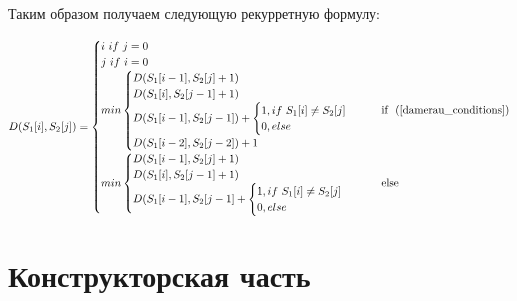 \documentclass[12pt, a4paper]{report}
\begin{document}
	Таким образом получаем следующую рекурретную формулу:
	
	\begin{equation}
	\label{formula_damerau}
	D(S_{1}[i],S_{2}[j]) = \begin{cases}
	i\ if\ j = 0\\
	j\ if\ i = 0\\
	min \begin{cases}
		D(S_{1}[i-1], S_{2}[j] + 1)\\
		D(S_{1}[i], S_{2}[j-1]+1)\\
		D(S_{1}[i-1], S_{2}[j-1])+
			\begin{cases}
				1, if\  S_{1}[i] \neq S_{2}[j]\\
				0, else
			\end{cases}\\
		D(S_{1}[i-2], S_{2}[j-2])+1
	\end{cases} & \mbox{if ~(\ref{damerau_conditions})}\\	
	min \begin{cases}
		D(S_{1}[i-1], S_{2}[j] + 1)\\
		D(S_{1}[i], S_{2}[j-1]+1)\\
		D(S_{1}[i-1], S_{2}[j-1]+
			\begin{cases}
				1, if\  S_{1}[i] \neq S_{2}[j]\\
				0, else
			\end{cases}
	\end{cases} & \mbox{else}\\
	\end{cases}
	\end{equation}

	\chapter{Конструкторская часть}
	
\end{document}
